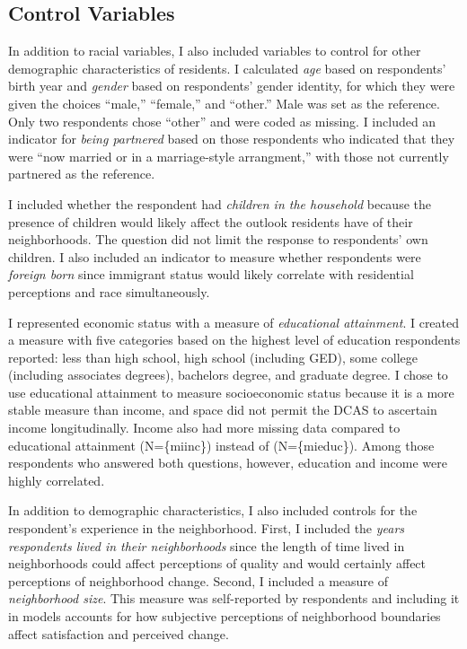 \documentclass{baderart}
\begin{document}
\subsection{Control Variables}\label{control-variables}

In addition to racial variables, I also included variables to control for other demographic characteristics of residents. I calculated \emph{age} based on respondents' birth year and \emph{gender} based on respondents' gender identity, for which they were given the choices ``male,'' ``female,'' and ``other.'' Male was set as the reference. Only two respondents chose ``other'' and were coded as missing. I included an indicator for \emph{being partnered} based on those respondents who indicated that they were ``now married or in a marriage-style arrangment,'' with those not currently partnered as the reference.

I included whether the respondent had \emph{children in the household} because the presence of children would likely affect the outlook residents have of their neighborhoods. The question did not limit the response to respondents' own children. I also included an indicator to measure whether respondents were \emph{foreign born} since immigrant status would likely correlate with residential perceptions and race simultaneously.

I represented economic status with a measure of \emph{educational attainment}. I created a measure with five categories based on the highest level of education respondents reported: less than high school, high school (including GED), some college (including associates degrees), bachelors degree, and graduate degree. I chose to use educational attainment to measure socioeconomic status because it is a more stable measure than income, and space did not permit the DCAS to ascertain income longitudinally. Income also had more missing data compared to educational attainment (N=\{miinc\}) instead of (N=\{mieduc\}). Among those respondents who answered both questions, however, education and income were highly correlated.

In addition to demographic characteristics, I also included controls for the respondent's experience in the neighborhood. First, I included the \emph{years respondents lived in their neighborhoods} since the length of time lived in neighborhoods could affect perceptions of quality and would certainly affect perceptions of neighborhood change. Second, I included a measure of \emph{neighborhood size}. This measure was self-reported by respondents and including it in models accounts for how subjective perceptions of neighborhood boundaries affect satisfaction and perceived change.
\end{document}
